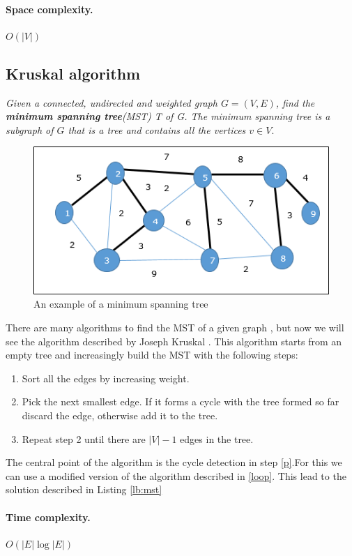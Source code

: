 \documentclass{article}
\begin{document}
\paragraph{Space complexity.} $O(|V|)$

\subsection{Kruskal algorithm}
\emph{Given a connected, undirected  and weighted  graph $G = (V,E)$,
find  the \textbf{minimum spanning tree}(MST) T  of G. The minimum spanning tree 
is a subgraph of $G$ that is a tree and contains all the vertices $v \in V$}.
    
\bigskip
\begin{figure}[h!]
    \centering
    \includegraphics[scale=0.8]{img/mst.png}
    \caption{An example of a minimum spanning tree}
\end{figure}
There are many algorithms to find the MST of a given graph \cite{prim1957shortest} \cite{nevsetvril2001otakar},
but now we will see the algorithm described by Joseph Kruskal \cite{kruskal1956shortest}.
This algorithm starts from an empty tree and increasingly build the MST with the following steps:
\begin{enumerate}
    \item Sort all the edges by increasing weight.
    \item \label{p}Pick the next smallest edge. If it forms a cycle with the  tree formed so far discard the edge, otherwise
    add it to the tree.
    \item Repeat step 2 until there are $|V| - 1$ edges in the tree.
\end{enumerate}
The central point of the algorithm is the cycle detection in step \ref{p}.For this we can use a modified version of the algorithm described in \ref{loop}. This lead to the solution 
described in Listing \ref{lb:mst} 
\paragraph{Time complexity.} $O(|E|\log|E|)$
\end{document}
